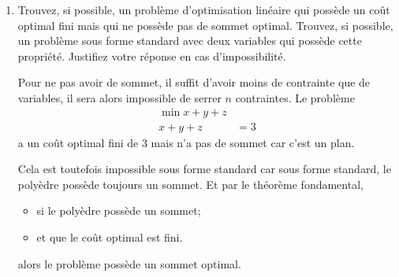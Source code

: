 \begin{enumerate}
    \begin{solution}
      Un même polyèdre peut être obtenu au moyen de
      représentations différentes.
      Si le polyèdre est identique,
      cela signifie qu'un des deux ensembles à des contraintes linéairement
      dépendantes des contraintes de l'autre ensemble.
      \begin{proof}
        Soient $A \in \R^{m \times n} $ et $B \in \R^{k \times n} $ des matrices
        telles que $Ax \geq b$ et $Bx \geq b$ représentent le même polyèdre.
        Supposons que $ k > m$ et que les lignes de $B$, à savoir,
        la suite $g_{1}, \dots, g_{k}$ n'engendrent pas $\R^{n}$.

        Dès lors, $\exists x \in \R^{n}$ tel que $x \notin \mathcal(B)$.
        Or, deux ensembles qui représentent un même polyèdre
        doivent avoir des contraintes communes.
        Il y a donc contradiction puisque, par hypothèse,
        l'espace ligne de $A$ forme une suite génératrice et $ k > m$.
        Le nombre de lignes de $B$ est donc supérieur au nombre de ligne de $A$
        et les lignes de $B$ sont linéairement dépendantes des lignes de $A$.
        La suite $g_{1}, \dots, g_{k}$ doit donc être génératrice.
      \end{proof}
    \end{solution}

  \item Trouvez, si possible, un problème d'optimisation linéaire qui possède un coût optimal fini mais qui ne possède pas de sommet optimal.
    Trouvez, si possible, un problème  sous forme standard avec deux variables qui possède cette propriété.  Justifiez votre réponse en cas
    d'impossibilité.

    \begin{solution}
      Pour ne pas avoir de sommet,
      il suffit d'avoir moins de contrainte que de variables,
      il sera alors impossible de serrer $n$ contraintes.
      Le problème
      \begin{align*}
        \min x + y + z\\
        x + y + z & = 3
      \end{align*}
      a un coût optimal fini de 3 mais n'a pas de sommet car c'est un plan.

      Cela est toutefois impossible sous forme standard car
      sous forme standard, le polyèdre possède toujours un sommet.
      Et par le théorème fondamental,
      \begin{itemize}
        \item si le polyèdre possède un sommet;
        \item et que le coût optimal est fini.
      \end{itemize}
      alors le problème possède un sommet optimal.
    \end{solution}


\end{enumerate}

